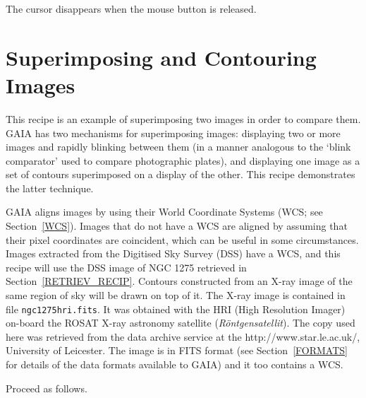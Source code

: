 \documentclass[twoside,11pt]{starlink}
\begin{document}
The cursor disappears when the mouse button is released.


\newpage
\section{\label{SUPER_RECIP}Superimposing and
Contouring Images}

This recipe is an example of superimposing two images in order to compare
them.  GAIA has two mechanisms for superimposing images: displaying two
or more images and rapidly blinking between them (in a manner analogous to
the `blink comparator' used to compare photographic plates), and displaying
one image as a set of contours superimposed on a display of the other.
This recipe demonstrates the latter technique.

GAIA aligns images by using their World Coordinate Systems (WCS; see
Section~\ref{WCS}).  Images that do not have a WCS are aligned by assuming
that their pixel coordinates are coincident, which can be useful in some
circumstances.  Images extracted from the Digitised Sky Survey (DSS) have
a WCS, and this recipe will use the DSS image of NGC 1275 retrieved in
Section~\ref{RETRIEV_RECIP}.  Contours constructed from an X-ray image of
the same region of sky will be drawn on top of it.  The X-ray image is
contained in file \texttt{ngc1275hri.fits}.  It was obtained with the HRI (High
Resolution Imager) on-board the ROSAT X-ray astronomy satellite (\textit{R\"{o}ntgensatellit}\/).  The copy used here was retrieved from the
data archive service at the
{http://www.star.le.ac.uk/}, University of Leicester.  The image is in
FITS format (see Section~\ref{FORMATS} for details of the data formats
available to GAIA) and it too contains a WCS.

Proceed as follows.
\end{document}
